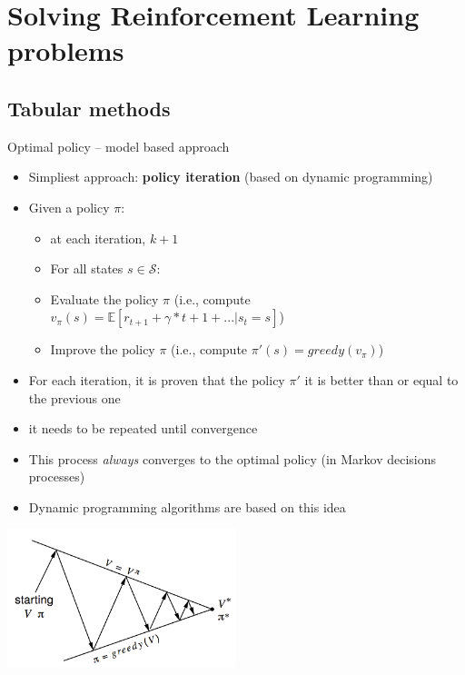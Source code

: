 \documentclass[presentation, 9pt]{beamer}\mode<presentation>{\usetheme{AMSBolognaFC}}
\begin{document}
\section{Solving Reinforcement Learning problems}
\subsection{Tabular methods}
\begin{frame}{Optimal policy -- model based approach}
\begin{itemize}
	\item Simpliest approach: \textbf{policy iteration} (based on dynamic programming)
	\item Given a policy $\pi$:
	\begin{itemize}
		\item at each iteration, $k+1$
		\item For all states $s \in \mathcal{S}$:
		\item Evaluate the policy $\pi$ (i.e., compute $v_{\pi}(s) = \mathbb{E}[r_{t+1} + \gamma * {t+1} + ... | s_t = s]$)
		\item Improve the policy $\pi$ (i.e., compute $\pi'(s) = greedy(v_\pi)$)
	\end{itemize}
	\item For each iteration, it is proven that the policy $\pi'$ it is better than or equal to the previous one
	\item it needs to be repeated until convergence
	\item This process \emph{always} converges to the optimal policy (in Markov decisions processes)
	\item Dynamic programming algorithms are based on this idea
\end{itemize}
\centering
\includegraphics[width=0.5\textwidth]{img/policy-iteration.png}
\end{frame}
\end{document}
